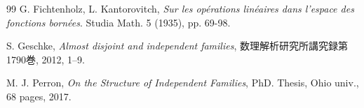 \documentclass[leqno, a4paper, 12pt]{jsarticle}
\begin{document}
\begin{thebibliography}{99}
G. Fichtenholz, L. Kantorovitch, 
\textit{Sur les op\'{e}rations lin\'{e}aires dans l'espace des fonctions born\'{e}es}. Studia Math.  5 (1935), pp. 69-98.

S. Geschke, 
\textit{Almost disjoint and independent families}, 
数理解析研究所講究録第1790巻, 2012, 1--9. 

M. J. Perron, 
\textit{On the Structure of Independent Families}, 
PhD. Thesis, 
Ohio univ., 
68 pages, 
2017. 
\end{thebibliography}
\end{document}
